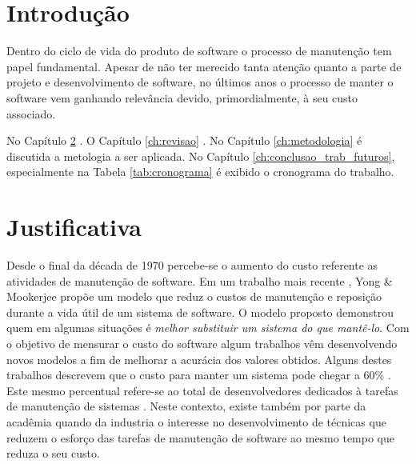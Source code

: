\documentclass[msc,proposal,hidelot,hideabstract]{ppgccufmg} %
\begin{document}
\chapter{Introdução}
\label{ch:intro}
Dentro do ciclo de vida do produto de software o processo de manutenção tem
papel fundamental. Apesar de não ter merecido tanta atenção quanto a parte de
projeto e desenvolvimento de software, no últimos anos o processo de manter o
software vem ganhando relevância devido, primordialmente, à seu custo
associado.

No Capítulo \ref{ch:justificativa} . O Capítulo \ref{ch:revisao} . No
Capítulo \ref{ch:metodologia} é discutida a metologia a ser aplicada. No
Capítulo \ref{ch:conclusao_trab_futuros}, especialmente na Tabela \ref{tab:cronograma} é exibido o cronograma do trabalho.

\chapter{Justificativa}
\label{ch:justificativa}
Desde o final da década de 1970 \cite{Zelkowitz:1979:PSE:578504}  percebe-se o aumento do custo referente as
atividades de  manutenção de software.
Em um trabalho mais recente \cite{1423995}, Yong \& Mookerjee propõe um modelo que reduz o custos de
manutenção e reposição durante a vida útil de um sistema de software. O modelo
proposto demonstrou quem em algumas situações é \textit{melhor substituir um
  sistema do que mantê-lo}. Com o objetivo de mensurar o custo do software
algum trabalhos vêm desenvolvendo novos modelos a fim de melhorar a acurácia
dos valores obtidos. Alguns destes trabalhos descrevem que o custo para manter
um sistema pode chegar a 60\% \cite{kaur2015review}. Este mesmo percentual
refere-se ao total de desenvolvedores dedicados à tarefas de manutenção de
sistemas \cite{Zhang_2003}. Neste contexto, existe também por parte da acadêmia quando da
industria o interesse no desenvolvimento de técnicas que reduzem o esforço das
tarefas de manutenção de software ao mesmo tempo que reduza o seu custo.
\end{document}
